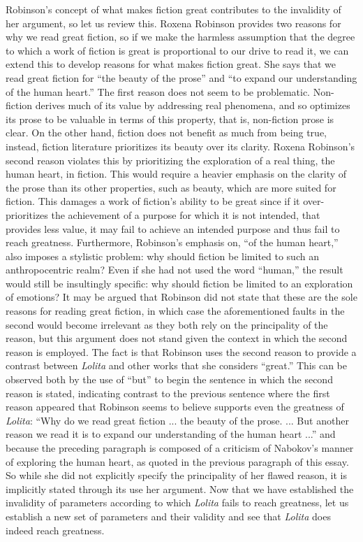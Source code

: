 \documentclass[12pt]{article}
\begin{document}
Robinson's concept of what makes fiction great contributes to the invalidity of her argument, so let us review this. Roxena Robinson provides two reasons for why we read great fiction, so if we make the harmless assumption that the degree to which a work of fiction is great is proportional to our drive to read it, we can extend this to develop reasons for what makes fiction great. She says that we read great fiction for ``the beauty of the prose'' and ``to expand our understanding of the human heart.'' The first reason does not seem to be problematic. Non-fiction derives much of its value by addressing real phenomena, and so optimizes its prose to be valuable in terms of this property, that is, non-fiction prose is clear. On the other hand, fiction does not benefit as much from being true, instead, fiction literature prioritizes its beauty over its clarity. Roxena Robinson's second reason violates this by prioritizing the exploration of a real thing, the human heart, in fiction. This would require a heavier emphasis on the clarity of the prose than its other properties, such as beauty, which are more suited for fiction. This damages a work of fiction's ability to be great since if it over-prioritizes the achievement of a purpose for which it is not intended, that provides less value, it may fail to achieve an intended purpose and thus fail to reach greatness. Furthermore, Robinson's emphasis on, ``of the human heart,'' also imposes a stylistic problem: why should fiction be limited to such an anthropocentric realm? Even if she had not used the word ``human,'' the result would still be insultingly specific: why should fiction be limited to an exploration of emotions? It may be argued that Robinson did not state that these are the sole reasons for reading great fiction, in which case the aforementioned faults in the second would become irrelevant as they both rely on the principality of the reason, but this argument does not stand given the context in which the second reason is employed. The fact is that Robinson uses the second reason to provide a contrast between \textit{Lolita} and other works that she considers ``great.'' This can be observed both by the use of ``but'' to begin the sentence in which the second reason is stated, indicating contrast to the previous sentence where the first reason appeared that Robinson seems to believe supports even the greatness of \textit{Lolita}: ``Why do we read great fiction ... the beauty of the prose. ... But another reason we read it is to expand our understanding of the human heart ...'' and because the preceding paragraph is composed of a criticism of Nabokov's manner of exploring the human heart, as quoted in the previous paragraph of this essay. So while she did not explicitly specify the principality of her flawed reason, it is implicitly stated through its use her argument. Now that we have established the invalidity of parameters according to which \textit{Lolita} fails to reach greatness, let us establish a new set of parameters and their validity and see that \textit{Lolita} does indeed reach greatness.
\end{document}
